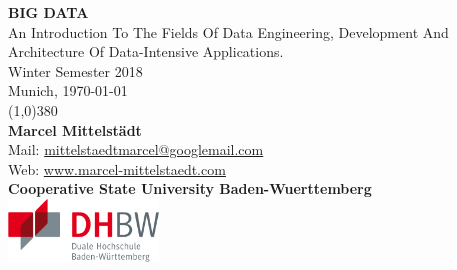 \begin{titlepage} 
\thispagestyle{empty} %

\begin{center}
\Huge{\textbf{BIG DATA}}\\[1.0 cm]

\Large{An Introduction To The Fields Of Data Engineering, Development And Architecture Of Data-Intensive Applications.}\\[2.0 cm]

\Large{\textemdash Winter Semester 2018 \textemdash}\\[0.5 cm]
\large{Munich, \today}\\[5.3 cm]

\line(1,0){380}\\[0.6 cm]

\normalsize{\textbf{Marcel Mittelstädt}}\\
Mail: \href{mailto:mittelstaedtmarcel@googlemail.com}{mittelstaedtmarcel@googlemail.com}\\
Web: \href{http://www.marcel-mittelstaedt.com}{www.marcel-mittelstaedt.com}\\[0.8 cm]

\textbf{Cooperative State University Baden-Wuerttemberg}\\
\includegraphics[width=0.3\textwidth]{dhbw_logo.png}\\

\end{center}

\end{titlepage}